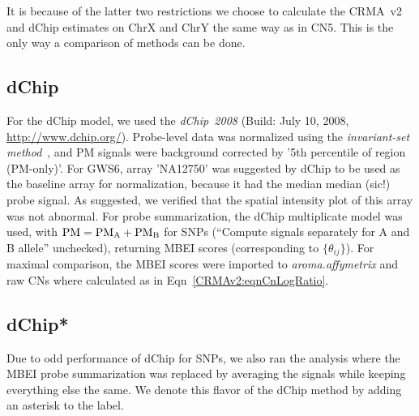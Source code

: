 \documentclass[10pt,a4paper]{article}
\newcommand{\PMA}{\ensuremath{\textnormal{PM}_\textnormal{A}}\xspace}
\newcommand{\PMB}{\ensuremath{\textnormal{PM}_\textnormal{B}}\xspace}
\newcommand{\pkg}[1]{\textit{#1}\xspace}
\newcommand{\PM}{\textnormal{PM}\xspace}
\begin{document}
It is because of the latter two restrictions we choose to calculate the CRMA~v2 and dChip estimates on ChrX and ChrY the same way as in CN5.  This is the only way a comparison of methods can be done.




\subsection{dChip}
For the dChip model, we used the \pkg{dChip~2008} (Build: July 10, 2008, \url{http://www.dchip.org/}).  Probe-level data was normalized using the \emph{invariant-set method}~\citep{LiWong_2001}, and PM signals were background corrected by '5th percentile of region (PM-only)'.  For GWS6, array 'NA12750' was suggested by dChip to be used as the baseline array for normalization, because it had the median median (sic!) probe signal.  As suggested, we verified that the spatial intensity plot of this array was not abnormal.
For probe summarization, the dChip multiplicate model was used, with $\PM=\PMA+\PMB$ for SNPs (``Compute signals separately for A and B allele'' unchecked), returning MBEI scores (corresponding to $\{\theta_{ij}\}$).  For maximal comparison, the MBEI scores were imported to \pkg{aroma.affymetrix} and raw CNs where calculated as in Eqn~\eqref{CRMAv2:eqnCnLogRatio}.


\subsection{dChip*}
Due to odd performance of dChip for SNPs, we also ran the analysis where the MBEI probe summarization was replaced by averaging the signals while keeping everything else the same.  We denote this flavor of the dChip method by adding an asterisk to the label.
\end{document}
